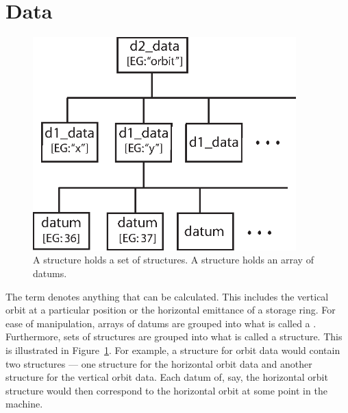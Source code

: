 \section{Data}
\label{s:data}

\begin{figure}
  \centering
  \includegraphics[width=4in]{data_tree.eps}
  \caption[Data tree structure]
{A  structure holds a set of  structures. 
A  structure holds an array of datums.}
  \label{f:data_tree}
\end{figure}

The term  denotes anything that can be calculated. This
includes the vertical orbit at a particular position or the horizontal
emittance of a storage ring. For ease of manipulation, arrays of
datums are grouped into what is called a 
. Furthermore, sets of  structures are
grouped into what is called a  structure.  This is
illustrated in Figure~\ref{f:data_tree}.  For example, a 
structure for orbit data would contain two  structures ---
one  structure for the horizontal orbit data and another
 structure for the vertical orbit data. Each datum of,
say, the horizontal orbit  structure would then correspond
to the horizontal orbit at some point in the machine.

